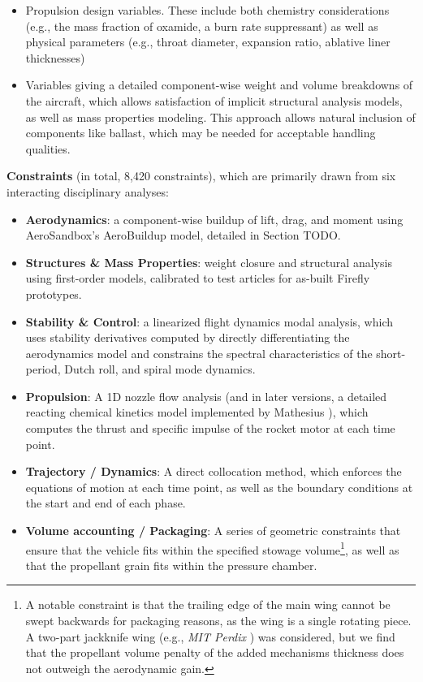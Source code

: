 \begin{example}
\begin{itemize}
\begin{itemize}
\begin{itemize}
                \item Propulsion design variables. These include both chemistry considerations (e.g., the mass fraction of oxamide, a burn rate suppressant) as well as physical parameters (e.g., throat diameter, expansion ratio, ablative liner thicknesses)

                \item Variables giving a detailed component-wise weight and volume breakdowns of the aircraft, which allows satisfaction of implicit structural analysis models, as well as mass properties modeling. This approach allows natural inclusion of components like ballast, which may be needed for acceptable handling qualities.

            \end{itemize}
        \end{itemize}

        \textbf{Constraints} (in total, 8,420 constraints), which are primarily drawn from six interacting disciplinary analyses:
        \begin{itemize}
            \item \textbf{Aerodynamics}: a component-wise buildup of lift, drag, and moment using AeroSandbox's AeroBuildup model, detailed in Section TODO.
            \item \textbf{Structures \& Mass Properties}: weight closure and structural analysis using first-order models, calibrated to test articles for as-built Firefly prototypes.
            \item \textbf{Stability \& Control}: a linearized flight dynamics modal analysis, which uses stability derivatives computed by directly differentiating the aerodynamics model and constrains the spectral characteristics of the short-period, Dutch roll, and spiral mode dynamics.
            \item \textbf{Propulsion}: A 1D nozzle flow analysis (and in later versions, a detailed reacting chemical kinetics model implemented by Mathesius \cite{mathesius_integrated_2023}), which computes the thrust and specific impulse of the rocket motor at each time point.
            \item \textbf{Trajectory / Dynamics}: A direct collocation method, which enforces the equations of motion at each time point, as well as the boundary conditions at the start and end of each phase.
            \item \textbf{Volume accounting / Packaging}: A series of geometric constraints that ensure that the vehicle fits within the specified stowage volume\footnote{A notable constraint is that the trailing edge of the main wing cannot be swept backwards for packaging reasons, as the wing is a single rotating piece. A two-part jackknife wing (e.g., \emph{MIT Perdix} \cite{tao_design_2012}) was considered, but we find that the propellant volume penalty of the added mechanisms thickness does not outweigh the aerodynamic gain.}, as well as that the propellant grain fits within the pressure chamber.
        \end{itemize}


\end{itemize}
\end{example}
